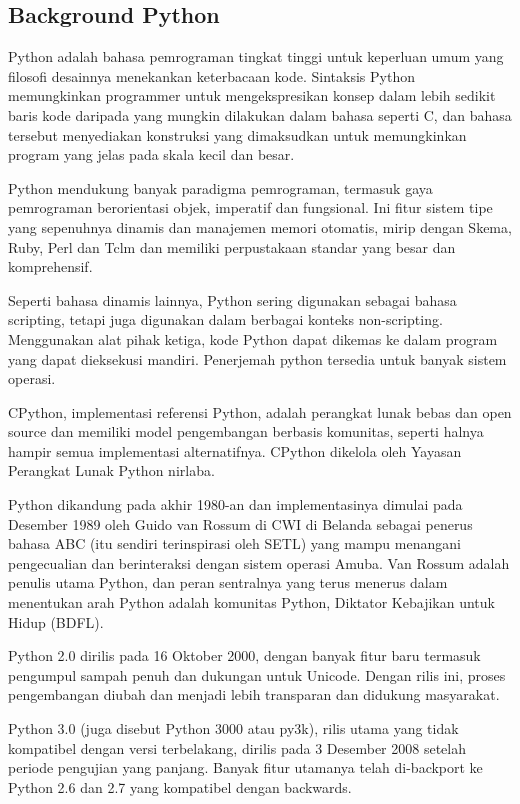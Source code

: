 \subsection{Background Python}
	\par 
	Python adalah bahasa pemrograman tingkat tinggi untuk keperluan umum yang filosofi desainnya menekankan keterbacaan kode. Sintaksis Python memungkinkan programmer untuk mengekspresikan konsep dalam lebih sedikit baris kode daripada yang mungkin dilakukan dalam bahasa seperti C, dan bahasa tersebut menyediakan konstruksi yang dimaksudkan untuk memungkinkan program yang jelas pada skala kecil dan besar\cite{van2007python}.
	\par
	Python mendukung banyak paradigma pemrograman, termasuk gaya pemrograman berorientasi objek, imperatif dan fungsional. Ini fitur sistem tipe yang sepenuhnya dinamis dan manajemen memori otomatis, mirip dengan Skema, Ruby, Perl dan Tclm dan memiliki perpustakaan standar yang besar dan komprehensif\cite{van2007python}.
	\par
	Seperti bahasa dinamis lainnya, Python sering digunakan sebagai bahasa scripting, tetapi juga digunakan dalam berbagai konteks non-scripting. Menggunakan alat pihak ketiga, kode Python dapat dikemas ke dalam program yang dapat dieksekusi mandiri. Penerjemah python tersedia untuk banyak sistem operasi\cite{van2007python}.
	\par
	CPython, implementasi referensi Python, adalah perangkat lunak bebas dan open source dan memiliki model pengembangan berbasis komunitas, seperti halnya hampir semua implementasi alternatifnya. CPython dikelola oleh Yayasan Perangkat Lunak Python nirlaba\cite{van2007python}.
	\par 
	Python dikandung pada akhir 1980-an dan implementasinya dimulai pada Desember 1989 oleh Guido van Rossum di CWI di Belanda sebagai penerus bahasa ABC (itu sendiri terinspirasi oleh SETL) yang mampu menangani pengecualian dan berinteraksi dengan sistem operasi Amuba. Van Rossum adalah penulis utama Python, dan peran sentralnya yang terus menerus dalam menentukan arah Python adalah komunitas Python, Diktator Kebajikan untuk Hidup (BDFL)\cite{van2007python}.
	\par 
	Python 2.0 dirilis pada 16 Oktober 2000, dengan banyak fitur baru termasuk pengumpul sampah penuh dan dukungan untuk Unicode. Dengan rilis ini, proses pengembangan diubah dan menjadi lebih transparan dan didukung masyarakat\cite{van2007python}.
	\par
	Python 3.0 (juga disebut Python 3000 atau py3k), rilis utama yang tidak kompatibel dengan versi terbelakang, dirilis pada 3 Desember 2008 setelah periode pengujian yang panjang. Banyak fitur utamanya telah di-backport ke Python 2.6 dan 2.7 yang kompatibel dengan backwards\cite{van2007python}.
	
